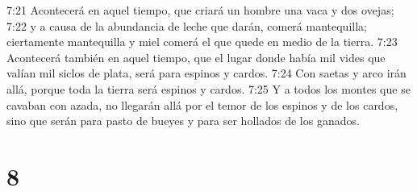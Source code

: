 7:21 Acontecerá en aquel tiempo, que criará un hombre una vaca y dos ovejas;  
7:22 y a causa de la abundancia de leche que darán, comerá mantequilla; ciertamente mantequilla y miel comerá el que quede en medio de la tierra.  
7:23 Acontecerá también en aquel tiempo, que el lugar donde había mil vides que valían mil siclos de plata,  será para espinos y cardos.  
7:24 Con saetas y arco irán allá, porque toda la tierra será espinos y cardos.  
7:25 Y a todos los montes que se cavaban con azada, no llegarán allá por el temor de los espinos y de los cardos, sino que serán para pasto de bueyes y para ser hollados de los ganados.  

\chapter{8}

